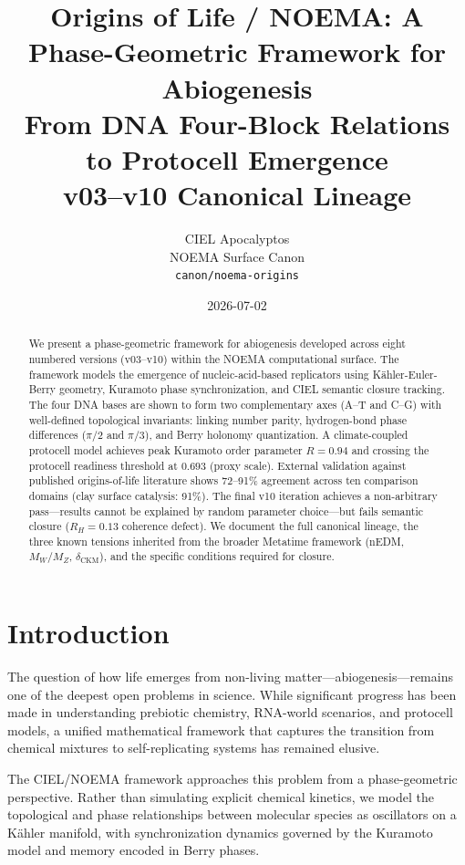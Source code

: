 \documentclass[11pt,a4paper]{article}
\title{Origins of Life / NOEMA: A Phase-Geometric Framework for Abiogenesis \\
       \large From DNA Four-Block Relations to Protocell Emergence \\
       \large v03--v10 Canonical Lineage}
\author{CIEL Apocalyptos \\ NOEMA Surface Canon \\
        \texttt{canon/noema-origins}}
\date{2026-07-02}
\begin{document}
\maketitle

\begin{abstract}
We present a phase-geometric framework for abiogenesis developed across eight numbered versions (v03--v10) within the NOEMA computational surface. The framework models the emergence of nucleic-acid-based replicators using K\"ahler-Euler-Berry geometry, Kuramoto phase synchronization, and CIEL semantic closure tracking. The four DNA bases are shown to form two complementary axes (A--T and C--G) with well-defined topological invariants: linking number parity, hydrogen-bond phase differences ($\pi/2$ and $\pi/3$), and Berry holonomy quantization. A climate-coupled protocell model achieves peak Kuramoto order parameter $R = 0.94$ and crossing the protocell readiness threshold at $0.693$ (proxy scale). External validation against published origins-of-life literature shows 72--91\% agreement across ten comparison domains (clay surface catalysis: 91\%). The final v10 iteration achieves a non-arbitrary pass---results cannot be explained by random parameter choice---but fails semantic closure ($R_H = 0.13$ coherence defect). We document the full canonical lineage, the three known tensions inherited from the broader Metatime framework (nEDM, $M_W/M_Z$, $\delta_{\text{CKM}}$), and the specific conditions required for closure.
\end{abstract}

\section{Introduction}

The question of how life emerges from non-living matter---abiogenesis---remains one of the deepest open problems in science. While significant progress has been made in understanding prebiotic chemistry, RNA-world scenarios, and protocell models, a unified mathematical framework that captures the transition from chemical mixtures to self-replicating systems has remained elusive.

The CIEL/NOEMA framework approaches this problem from a phase-geometric perspective. Rather than simulating explicit chemical kinetics, we model the topological and phase relationships between molecular species as oscillators on a K\"ahler manifold, with synchronization dynamics governed by the Kuramoto model and memory encoded in Berry phases.
\end{document}
